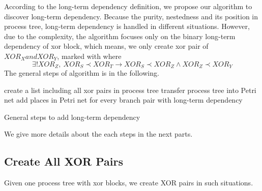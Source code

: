 \documentclass[]{article}
\begin{document}
According to the long-term dependency definition, we propose our algorithm to discover long-term dependency. Because the purity, nestedness and its position in process tree, long-term dependency is handled in different situations. However, due to the complexity, the algorithm focuses only on the binary long-term dependency of xor block, which means, we only create xor pair of $XOR_X and XOR_Y$, marked with where 
\[ \exists ! XOR_Z, \: XOR_S \prec XOR_T \rightarrow XOR_S \prec XOR_Z \land XOR_Z \prec XOR_Y \]
The general steps of algorithm is in the following. \\
\begin{algorithm}[H]
	\SetAlgoLined
	create a list including all xor pairs in process tree\;
	transfer process tree into Petri net\;
	add places in Petri net for every branch pair with long-term dependency\;
	\caption{General steps to add long-term dependency}
\end{algorithm}
We give more details about the each steps in the next parts.
\subsection{Create All XOR Pairs}
Given one process tree with xor blocks, we create XOR pairs in such situations. 
\end{document}
